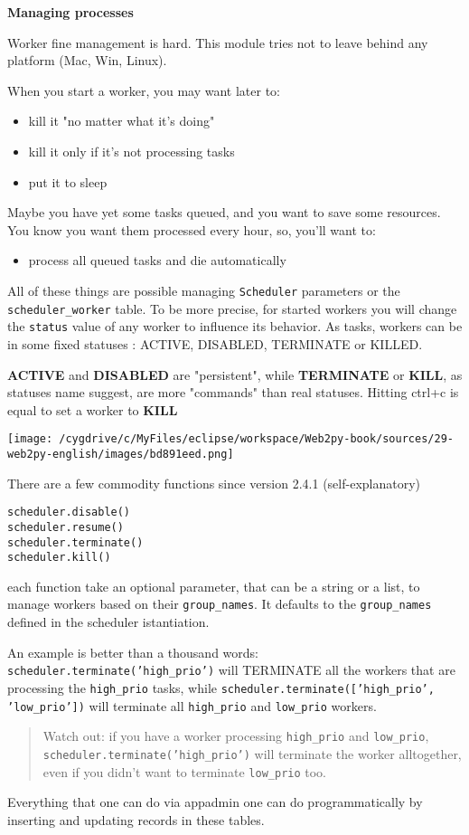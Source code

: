 \documentclass[justified,sixbynine,notoc]{tufte-book}
\def\ft{\small\tt}
\begin{document}
\begin{fullwidth}
{\bf Managing processes}

Worker fine management is hard. This module tries not to leave behind any platform (Mac, Win, Linux).

When you start a worker, you may want later to:
\begin{itemize}
\item kill it "no matter what it's doing"

\item kill it only if it's not processing tasks

\item put it to sleep
\end{itemize}
Maybe you have yet some tasks queued, and you want to save some resources.
You know you want them processed every hour, so, you'll want to:
\begin{itemize}
\item process all queued tasks and die automatically
\end{itemize}
All of these things are possible managing {\ft Scheduler} parameters or the {\ft scheduler\_worker} table.
To be more precise, for started workers you will change the {\ft status} value of any worker to influence
its behavior.
As tasks, workers can be in some fixed statuses : ACTIVE, DISABLED, TERMINATE or KILLED.

{\bf ACTIVE} and {\bf DISABLED} are "persistent", while {\bf TERMINATE} or {\bf KILL}, as statuses
name suggest, are more "commands" than real statuses.
Hitting ctrl+c is equal to set a worker to {\bf KILL}


\goodbreak\begin{center}\texttt{[image: /cygdrive/c/MyFiles/eclipse/workspace/Web2py-book/sources/29-web2py-english/images/bd891eed.png]}\end{center}


There are a few commodity functions since version 2.4.1 (self-explanatory)
\begin{lstlisting}
scheduler.disable()
scheduler.resume()
scheduler.terminate()
scheduler.kill()
\end{lstlisting}
\noindent each function take an optional parameter, that can be a string or a list, to manage workers based on their {\ft group\_names}. It defaults to the {\ft group\_names} defined in the scheduler istantiation.

An example is better than a thousand words: {\ft scheduler.terminate('high\_prio')} will TERMINATE all the workers that are processing the {\ft high\_prio} tasks, while {\ft scheduler.terminate(['high\_prio', 'low\_prio'])} will terminate all {\ft high\_prio} and {\ft low\_prio} workers.
\begin{quote}Watch out: if you have a worker processing {\ft high\_prio} and {\ft low\_prio}, {\ft scheduler.terminate('high\_prio')} will terminate the worker alltogether, even if you didn't want to terminate {\ft low\_prio} too.\end{quote}
Everything that one can do via appadmin one can do programmatically by inserting and updating records in these tables.


\end{fullwidth}
\end{document}
